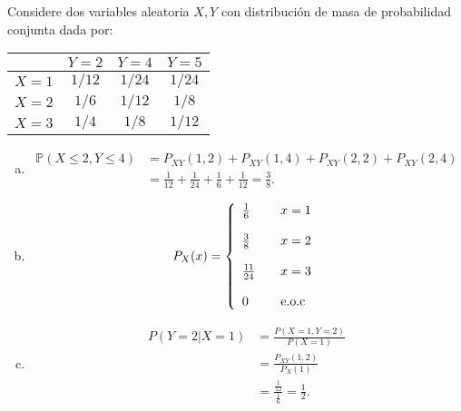 
\addpoints
\question[15] Considere dos variables aleatoria $X,Y$ con distribución de masa de probabilidad conjunta dada por:

\begin{center}
\begin{tabular}{|c|c|c|c|}

\hline 
 & $Y=2$ & $Y=4$ & $Y=5$ \\ 
\hline 
$X=1$ & $1/12$ & $1/24$ & $1/24$ \\ 
\hline 
$X=2$ & $1/6$ & $1/12$ & $1/8$ \\ 
\hline 
$X=3$ & $1/4$ & $1/8$ & $1/12$ \\ 
\hline 
\end{tabular} 
\end{center}
\noaddpoints
{}

\begin{solution}
 \begin{enumerate}[a)]
\item \begin{align*}
\mathbb{P}(X \leq 2, Y \leq 4) &=P_{XY}(1,2)+ P_{XY}(1,4)+P_{XY}(2,2)+ P_{XY}(2,4)\\
&=\frac{1}{12}+\frac{1}{24}+\frac{1}{6}+\frac{1}{12}=\frac{3}{8}.
\end{align*}
\item \begin{equation}
 \nonumber P_X(x) = \left\{
  \begin{array}{l l}
     \frac{1}{6} &  \quad x=1  \\
      &  \quad   \\
     \frac{3}{8} &  \quad x=2  \\
      &  \quad   \\
      \frac{11}{24} &  \quad x=3  \\
      &  \quad   \\
    0 &  \quad \text{e.o.c}
  \end{array} \right.
\end{equation}
\item \begin{align}%
       \nonumber P(Y=2 | X=1)&=\frac{P(X=1, Y=2)}{P(X=1)}\\
       \nonumber &=\frac{P_{XY}(1,2)}{P_X(1)}\\
       \nonumber &=\frac{\frac{1}{12}}{\frac{1}{6}}=\frac{1}{2}.
     \end{align}
\end{enumerate}
\end{solution}
